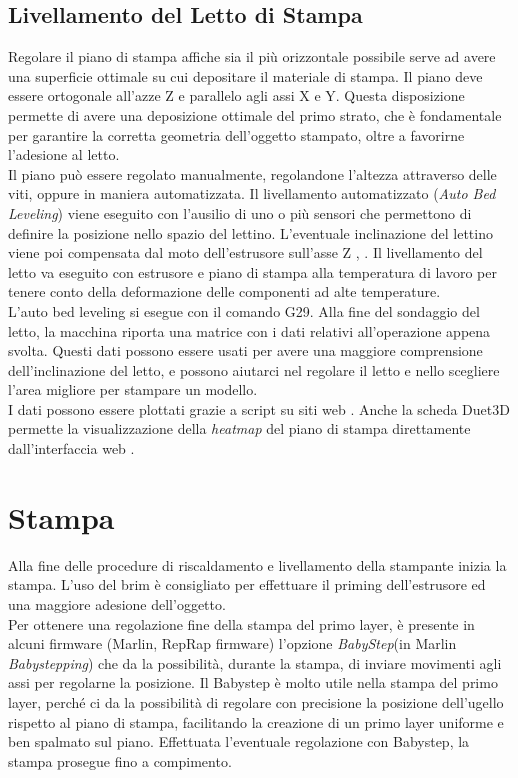 \subsection{Livellamento del Letto di Stampa}
Regolare il piano di stampa affiche sia il più orizzontale possibile serve ad avere una superficie ottimale su cui depositare il materiale di stampa. Il piano deve essere ortogonale all'azze Z e parallelo agli assi X e Y. Questa disposizione permette di avere una deposizione ottimale del primo strato, che è fondamentale per garantire la corretta geometria dell'oggetto stampato, oltre a favorirne l'adesione al letto.\\
Il piano può essere regolato manualmente, regolandone l'altezza attraverso delle viti, oppure  in maniera automatizzata. Il livellamento automatizzato (\emph{Auto Bed Leveling}) viene eseguito con l'ausilio di uno o più sensori che permettono di definire la posizione nello spazio del lettino. L'eventuale inclinazione del lettino viene poi compensata dal moto dell'estrusore sull'asse Z \parencite{Reference7}, \parencite{Reference8}. Il livellamento del letto va eseguito con estrusore e piano di stampa alla temperatura di lavoro per tenere conto della deformazione delle componenti ad alte temperature.  \\
L'auto bed leveling si esegue con il comando G29. Alla fine del sondaggio del letto, la macchina riporta una matrice con i dati relativi all'operazione appena svolta. Questi dati possono essere usati per avere una maggiore comprensione dell'inclinazione del letto, e possono aiutarci nel regolare il letto e nello scegliere l'area migliore per stampare un modello.\\
I dati possono essere plottati grazie a script su siti web \parencite{Reference9}. Anche la scheda Duet3D permette la visualizzazione della \emph{heatmap} del piano di stampa direttamente dall'interfaccia web \parencite{Reference10}.

\section {Stampa}
Alla fine delle procedure di riscaldamento e livellamento della stampante inizia la stampa. L'uso del brim è consigliato per effettuare il priming dell'estrusore ed una maggiore adesione dell'oggetto.\\
Per ottenere una regolazione fine della stampa del primo layer, è presente in alcuni firmware (Marlin, RepRap firmware) l'opzione \emph{BabyStep}(in Marlin \emph{Babystepping}) che da la possibilità, durante la stampa, di inviare movimenti agli assi per regolarne la posizione. Il Babystep è molto utile nella stampa del primo layer, perché ci da la possibilità di regolare con precisione la posizione dell'ugello rispetto al piano di stampa, facilitando la creazione di un primo layer uniforme e ben spalmato sul piano.
Effettuata l'eventuale regolazione con Babystep, la stampa prosegue fino a compimento.

